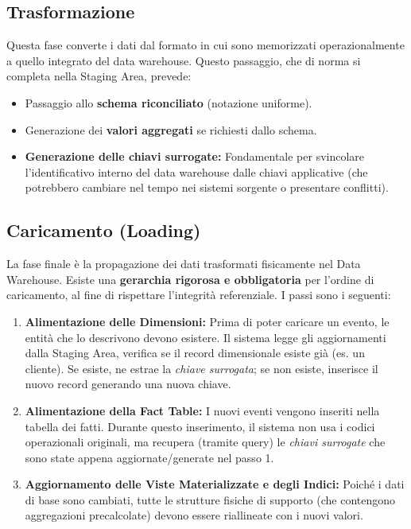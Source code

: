 \subsection{Trasformazione}
Questa fase converte i dati dal formato in cui sono memorizzati operazionalmente a quello integrato del data warehouse. Questo passaggio, che di norma si completa nella Staging Area, prevede:
\begin{itemize}
    \item Passaggio allo \textbf{schema riconciliato} (notazione uniforme).
    \item Generazione dei \textbf{valori aggregati} se richiesti dallo schema.
    \item \textbf{Generazione delle chiavi surrogate:} Fondamentale per svincolare l'identificativo interno del data warehouse dalle chiavi applicative (che potrebbero cambiare nel tempo nei sistemi sorgente o presentare conflitti).
\end{itemize}

\subsection{Caricamento (Loading)}
La fase finale è la propagazione dei dati trasformati fisicamente nel Data Warehouse. 
Esiste una \textbf{gerarchia rigorosa e obbligatoria} per l'ordine di caricamento, al fine di rispettare l'integrità referenziale. I passi sono i seguenti:
\begin{enumerate}
    \item \textbf{Alimentazione delle Dimensioni:} Prima di poter caricare un evento, le entità che lo descrivono devono esistere. 
    Il sistema legge gli aggiornamenti dalla Staging Area, verifica se il record dimensionale esiste già (es. un cliente). Se esiste, ne estrae la \textit{chiave surrogata}; se non esiste, inserisce il nuovo record generando una nuova chiave.
    \item \textbf{Alimentazione della Fact Table:} I nuovi eventi vengono inseriti nella tabella dei fatti. Durante questo inserimento, il sistema non usa i codici operazionali originali, ma recupera (tramite query) le \textit{chiavi surrogate} che sono state appena aggiornate/generate nel passo 1.
    \item \textbf{Aggiornamento delle Viste Materializzate e degli Indici:} Poiché i dati di base sono cambiati, tutte le strutture fisiche di supporto (che contengono aggregazioni precalcolate) devono essere riallineate con i nuovi valori.
\end{enumerate}


